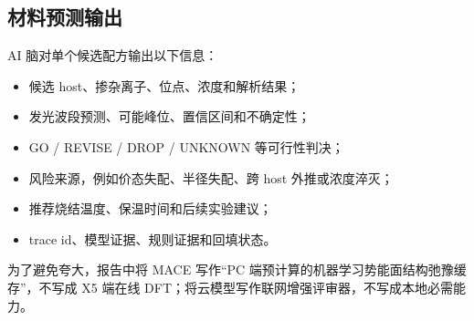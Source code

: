 \subsection{材料预测输出}
AI 脑对单个候选配方输出以下信息：
\begin{itemize}
  \item 候选 host、掺杂离子、位点、浓度和解析结果；
  \item 发光波段预测、可能峰位、置信区间和不确定性；
  \item GO / REVISE / DROP / UNKNOWN 等可行性判决；
  \item 风险来源，例如价态失配、半径失配、跨 host 外推或浓度淬灭；
  \item 推荐烧结温度、保温时间和后续实验建议；
  \item trace id、模型证据、规则证据和回填状态。
\end{itemize}

为了避免夸大，报告中将 MACE 写作“PC 端预计算的机器学习势能面结构弛豫缓存”，不写成 X5 端在线 DFT；将云模型写作联网增强评审器，不写成本地必需能力。
